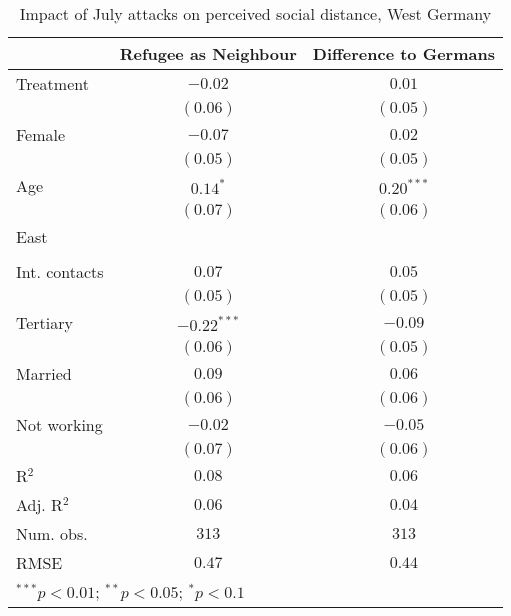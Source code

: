 
\begin{table}
\caption{Impact of July attacks on perceived social distance, West Germany}
\begin{center}
\begin{tabular}{l c c}
\toprule
 & Refugee as Neighbour & Difference to Germans \\
\midrule
Treatment     & $-0.02$       & $0.01$       \\
              & $(0.06)$      & $(0.05)$     \\
Female        & $-0.07$       & $0.02$       \\
              & $(0.05)$      & $(0.05)$     \\
Age           & $0.14^{*}$    & $0.20^{***}$ \\
              & $(0.07)$      & $(0.06)$     \\
East          &               &              \\
              &               &              \\
Int. contacts & $0.07$        & $0.05$       \\
              & $(0.05)$      & $(0.05)$     \\
Tertiary      & $-0.22^{***}$ & $-0.09$      \\
              & $(0.06)$      & $(0.05)$     \\
Married       & $0.09$        & $0.06$       \\
              & $(0.06)$      & $(0.06)$     \\
Not working   & $-0.02$       & $-0.05$      \\
              & $(0.07)$      & $(0.06)$     \\
\midrule
R$^2$         & $0.08$        & $0.06$       \\
Adj. R$^2$    & $0.06$        & $0.04$       \\
Num. obs.     & $313$         & $313$        \\
RMSE          & $0.47$        & $0.44$       \\
\bottomrule
\multicolumn{3}{l}{\scriptsize{$^{***}p<0.01$; $^{**}p<0.05$; $^{*}p<0.1$}}
\end{tabular}
\label{tab_dist_west}
\end{center}
\end{table}
